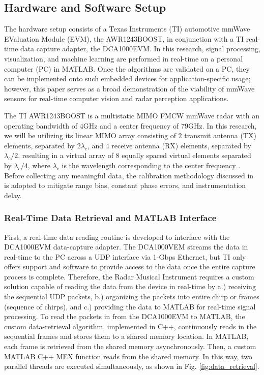 \documentclass[10pt,journal,final]{IEEEtran}
\begin{document}
\subsection{Hardware and Software Setup}
\label{subsec:hardware_setup_and_challenges}
The hardware setup consists of a Texas Instruments (TI) automotive mmWave EValuation Module (EVM), the AWR1243BOOST, in conjunction with a TI real-time data capture adapter, the DCA1000EVM. In this research, signal processing, visualization, and machine learning are performed in real-time on a personal computer (PC) in MATLAB. Once the algorithms are validated on a PC, they can be implemented onto such embedded devices for application-specific usage; however, this paper serves as a broad demonstration of the viability of mmWave sensors for real-time computer vision and radar perception applications.

The TI AWR1243BOOST is a multistatic MIMO FMCW mmWave radar with an operating bandwidth of $4$GHz and a center frequency of $79$GHz. In this research, we will be utilizing its linear MIMO array consisting of $2$ transmit antenna (TX) elements, separated by $2\lambda_c$, and $4$ receive antenna (RX) elements, separated by $\lambda_c/2$, resulting in a virtual array of 8 equally spaced virtual elements separated by $\lambda_c/4$, where $\lambda_c$ is the wavelength corresponding to the center frequency \cite{ti:intro_to_FMCW_radars}. Before collecting any meaningful data, the calibration methodology discussed in \cite{muhammet:testbeds} is adopted to mitigate range bias, constant phase errors, and instrumentation delay.

\subsubsection{Real-Time Data Retrieval and MATLAB Interface}
\label{subsubsec:real_time_data_retrieval_and_MATLAB_interface}
First, a real-time data reading routine is developed to interface with the DCA1000EVM data-capture adapter. The DCA1000VEM streams the data in real-time to the PC across a UDP interface via 1-Gbps Ethernet, but TI only offers support and software to provide access to the data once the entire capture process is complete. Therefore, the Radar Musical Instrument requires a custom solution capable of reading the data from the device in real-time by a.) receiving the sequential UDP packets, b.) organizing the packets into entire chirp or frames (sequence of chirps), and c.) providing the data to MATLAB for real-time signal processing. To read the packets in from the DCA1000EVM to MATLAB, the custom data-retrieval algorithm, implemented in C++, continuously reads in the sequential frames and stores them to a shared memory location. In MATLAB, each frame is retrieved from the shared memory asynchronously. Then, a custom MATLAB C++ MEX function reads from the shared memory. In this way, two parallel threads are executed simultaneously, as shown in Fig. \ref{fig:data_retrieval}.
\end{document}
